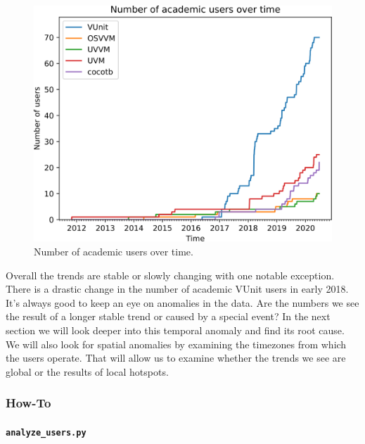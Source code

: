 \documentclass[]{article}
\let\oldparagraph\paragraph
\renewcommand{\paragraph}[1]{\oldparagraph{#1}\mbox{}}
\begin{document}
\begin{figure}

{\centering \includegraphics[width=0.75\linewidth]{img/academic_users_over_time} 

}

\caption{Number of academic users over time.}\label{fig:academic-trends}
\end{figure}

Overall the trends are stable or slowly changing with one notable exception. There is a drastic change in the number of academic VUnit users in early 2018. It's always good to keep an eye on anomalies in the data. Are the numbers we see the result of a longer stable trend or caused by a special event? In the next section we will look deeper into this temporal anomaly and find its root cause. We will also look for spatial anomalies by examining the timezones from which the users operate. That will allow us to examine whether the trends we see are global or the results of local hotspots.

\hypertarget{users-howto}{%
\subsubsection{How-To}\label{users-howto}}

\hypertarget{analyze-users}{%
\paragraph{\texorpdfstring{\texttt{analyze\_users.py}}{analyze\_users.py}}\label{analyze-users}}
\end{document}
